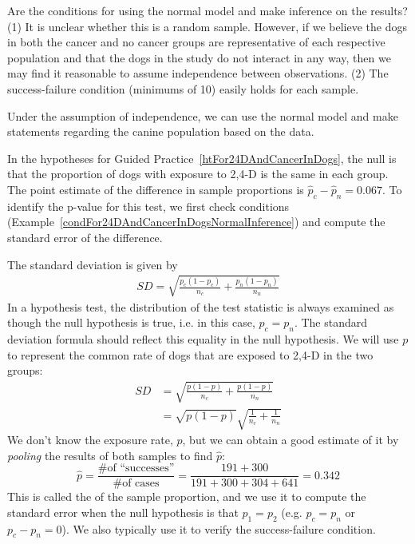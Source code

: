 \begin{example}{Are the conditions for using the normal model and make inference on the results?}\label{condFor24DAndCancerInDogsNormalInference}
(1) It is unclear whether this is a random sample. However, if we believe the dogs in both the cancer and no cancer groups are representative of each respective population and that the dogs in the study do not interact in any way, then we may find it reasonable to assume independence between observations. (2) The success-failure condition (minimums of 10) easily holds for each sample.

Under the assumption of independence, we can use the normal model and make statements regarding the canine population based on the data.
\end{example}


In the hypotheses for Guided Practice~\ref{htFor24DAndCancerInDogs}, the null is that the proportion of dogs with exposure to 2,4-D is the same in each group. The point estimate of the difference in sample proportions is $\hat{p}_c - \hat{p}_n = 0.067$. To identify the p-value for this test, we first check conditions (Example~\ref{condFor24DAndCancerInDogsNormalInference}) and compute the standard error of the difference. 

The standard deviation is given by
\begin{align*}
SD = \sqrt{\frac{p_c(1-p_c)}{n_c} + \frac{p_n(1-p_n)}{n_n}}
\end{align*}
In a hypothesis test, the distribution of the test statistic is always examined as though the null hypothesis is true, i.e. in this case, $p_c = p_n$. The standard deviation formula should reflect this equality in the null hypothesis. We will use $p$ to represent the common rate of dogs that are exposed to 2,4-D in the two groups:
\begin{align*}
SD &= \sqrt{\frac{p(1-p)}{n_c} + \frac{p(1-p)}{n_n}} \\
	&= \sqrt{p(1-p)}\sqrt{\frac{1}{n_c} + \frac{1}{n_n}}
\end{align*}
We don't know the exposure rate, $p$, but we can obtain a good estimate of it by \emph{pooling} the results of both samples to find $\hat{p}$:
$$\hat{p} = \frac{\text{\# of ``successes''}}{\text{\# of cases}} = \frac{191 + 300}{191+300+304+641} = 0.342$$
This is called the  of the sample proportion, and we use it to compute the standard error when the null hypothesis is that $p_1 = p_2$ (e.g. $p_c = p_n$ or $p_c - p_n = 0$). We also typically use it to verify the success-failure condition.

